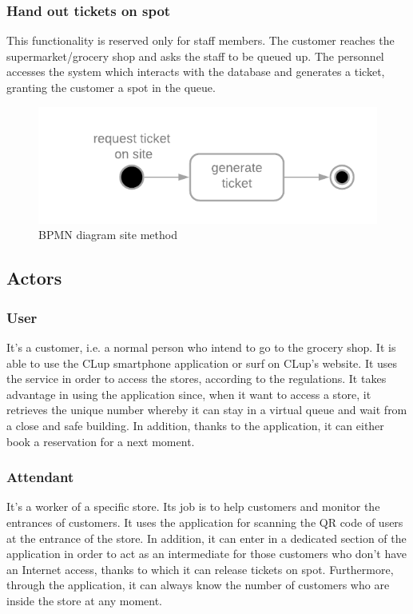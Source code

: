 \documentclass[table, 12pt]{article}
\begin{document}
\subsubsection{Hand out tickets on spot}

This functionality is reserved only for staff members. The customer reaches the supermarket/grocery shop and asks the staff to be queued up. The personnel accesses the system which interacts with the database and generates a ticket, granting the customer a spot in the queue.
\begin{figure}[!htb]
    \begin{center}
        \includegraphics[scale=0.5]{assets/function-hand-up.png}
        \caption{BPMN diagram site method}
    \end{center}
\end{figure}

\subsection{Actors}
\subsubsection{User}
It's a customer, i.e. a normal person who intend to go to the grocery shop. It is able to use the CLup smartphone application or surf on CLup's website. It uses the service in order to access the stores, according to the regulations. It takes advantage in using the application since, when it want to access a store, it retrieves the unique number whereby it can stay in a virtual queue and wait from a close and safe building. In addition, thanks to the application, it can either book a reservation for a next moment.

\subsubsection{Attendant}
It's a worker of a specific store. Its job is to help customers and monitor the entrances of customers. It uses the application for scanning the QR code of users at the entrance of the store. In addition, it can enter in a dedicated section of the application in order to act as an intermediate for those customers who don't have an Internet access, thanks to which it can release tickets on spot. Furthermore, through the application, it can always know the number of customers who are inside the store at any moment.
\end{document}
